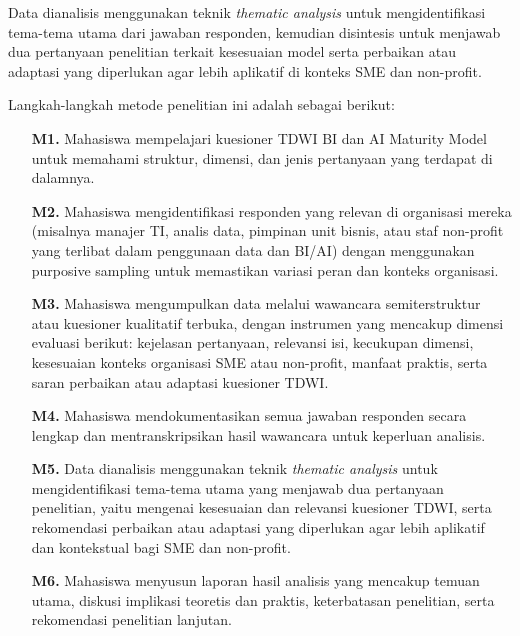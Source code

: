 \documentclass{article}
\begin{document}
Data dianalisis menggunakan teknik \textit{thematic analysis} untuk mengidentifikasi tema-tema utama dari jawaban responden, kemudian disintesis untuk menjawab dua pertanyaan penelitian terkait kesesuaian model serta perbaikan atau adaptasi yang diperlukan agar lebih aplikatif di konteks SME dan non-profit.

Langkah-langkah metode penelitian ini adalah sebagai berikut:

\begin{enumerate}
	\item[\textbf{M1.}] Mahasiswa mempelajari kuesioner TDWI BI dan AI Maturity Model untuk memahami struktur, dimensi, dan jenis pertanyaan yang terdapat di dalamnya.
	
	\item[\textbf{M2.}] Mahasiswa mengidentifikasi responden yang relevan di organisasi mereka (misalnya manajer TI, analis data, pimpinan unit bisnis, atau staf non-profit yang terlibat dalam penggunaan data dan BI/AI) dengan menggunakan purposive sampling untuk memastikan variasi peran dan konteks organisasi.
	
	\item[\textbf{M3.}] Mahasiswa mengumpulkan data melalui wawancara semiterstruktur atau kuesioner kualitatif terbuka, dengan instrumen yang mencakup dimensi evaluasi berikut: kejelasan pertanyaan, relevansi isi, kecukupan dimensi, kesesuaian konteks organisasi SME atau non-profit, manfaat praktis, serta saran perbaikan atau adaptasi kuesioner TDWI.
	
	\item[\textbf{M4.}] Mahasiswa mendokumentasikan semua jawaban responden secara lengkap dan mentranskripsikan hasil wawancara untuk keperluan analisis.
	
	\item[\textbf{M5.}] Data dianalisis menggunakan teknik \textit{thematic analysis} untuk mengidentifikasi tema-tema utama yang menjawab dua pertanyaan penelitian, yaitu mengenai kesesuaian dan relevansi kuesioner TDWI, serta rekomendasi perbaikan atau adaptasi yang diperlukan agar lebih aplikatif dan kontekstual bagi SME dan non-profit.
	
	\item[\textbf{M6.}] Mahasiswa menyusun laporan hasil analisis yang mencakup temuan utama, diskusi implikasi teoretis dan praktis, keterbatasan penelitian, serta rekomendasi penelitian lanjutan.
\end{enumerate}

\end{document}
